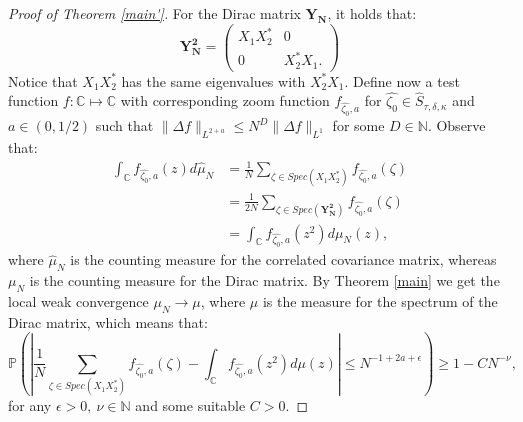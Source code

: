 \documentclass[10pt,a4paper]{amsart}
\newcommand{\beq}{\begin{equation}}
\newcommand{\eeq}{\end{equation}}
\begin{document}
\begin{proof}[Proof of Theorem \ref{main'}]
For the Dirac matrix $\mathbf{Y_N}$, it holds that:
\[
\mathbf{Y^2_N} = \begin{pmatrix}
    X_1 X_2^* & 0 \\ 0 & X_2^*X_1 .
\end{pmatrix}
\]
Notice that $X_1X_2^*$ has the same eigenvalues with $X_2^* X_1 $. Define now a test function $f: \mathbb{C}\mapsto \mathbb{C}$ with corresponding zoom function $f_{\widehat{\zeta_0},a}$ for $\widehat{\zeta_0} \in \widehat{S}_{\tau,\delta,\kappa}$ and $a\in (0,1/2)$ such that $\|\Delta f\|_{L^{2+a}} \leq N^D \|\Delta f \|_{L^1}$ for some $D \in \mathbb{N}$. Observe that:
%
\begin{align*}
\int_{\mathbb{C}} f_{\widehat{\zeta_0},a} (z) d \widehat{\mu}_N &= \frac{1}{N}  \sum \limits_{\zeta \in Spec(X_1X_2^*)} f_{\widehat{\zeta_0},a} (\zeta) \\
&= \frac{1}{2N} \sum \limits_{\zeta \in Spec(\mathbf{Y^2_N})} f_{\widehat{\zeta_0},a} (\zeta)\\
&= \int_{\mathbb{C}} f_{\widehat{\zeta_0},a} (z^2) d\mu_N (z),
\end{align*}
where $\widehat{\mu}_N$ is the counting measure for the correlated covariance matrix, whereas $\mu_N$ is the counting measure for the Dirac matrix. By Theorem \ref{main} we get the local weak convergence $\mu_N \to \mu$, where $\mu$ is the measure for the spectrum of the Dirac matrix, which means that:
\beq \label{prob-ineq}
\mathbb{P} \left ( \left | \frac{1}{N} \sum_{\zeta \in Spec(X_1X_2^*) }f_{\widehat{\zeta_0},a}( \zeta)   - \int_{\mathbb{C}} f_{\widehat{\zeta_0},a} (z^2) d\mu(z) \right | \leq N^{-1+2a+\epsilon} \right ) \geq 1 - CN^{-\nu},
\eeq
for any $\epsilon>0,\ \nu \in \mathbb{N}$ and some suitable $C>0$.


\end{proof}
\end{document}
